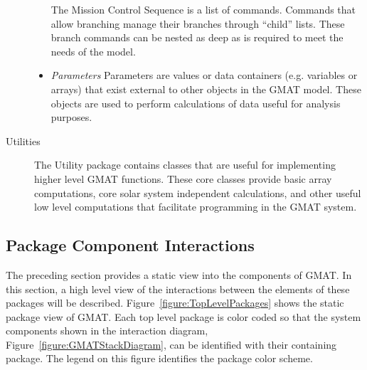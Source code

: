 \begin{description}
\begin{itemize}
    The Mission Control Sequence is a list of commands.  Commands that allow branching manage their
branches through ``child'' lists.  These branch commands can be nested as deep as is required to
meet the needs of the model.
    \item \textit{Parameters} Parameters are values or data containers (e.g.
variables or arrays) that exist external to other objects in the GMAT model.  These objects are used
to perform calculations of data useful for analysis purposes.
  \end{itemize}
  \item[Utilities] The Utility package contains classes that are useful for
implementing higher level GMAT functions.  These core classes provide basic array computations, core
solar system independent calculations, and other useful low level computations that facilitate
programming in the GMAT system.
\end{description}

\subsection{Package Component Interactions}

The preceding section provides a static view into the components of GMAT.  In this section, a
high level view of the interactions between the elements of these packages will be described.
Figure~\ref{figure:TopLevelPackages} shows the static package view of GMAT.  Each top level package
is color coded so that the system components shown in the interaction diagram,
Figure~\ref{figure:GMATStackDiagram}, can be identified with their containing package.  The legend
on this figure identifies the package color scheme.

